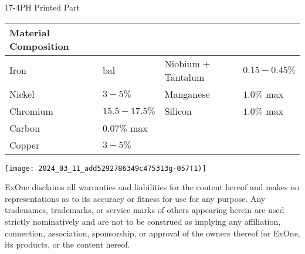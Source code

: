 \documentclass[10pt]{article}
\begin{document}
17-4PH Printed Part

\begin{center}
\begin{tabular}{|l|l|l|l|}
\hline
Material Composition &  &  &  \\
\hline
Iron & bal & Niobium + Tantalum & $0.15-0.45 \%$ \\
\hline
Nickel & $3-5 \%$ & Manganese & $1.0 \%$ max \\
\hline
Chromium & $15.5-17.5 \%$ & Silicon & $1.0 \%$ max \\
\hline
Carbon & $0.07 \%$ max &  &  \\
\hline
Copper & $3-5 \%$ &  &  \\
\hline
\end{tabular}
\end{center}

\begin{center}
\texttt{[image: 2024\_03\_11\_add5292786349c475313g-057(1)]}
\end{center}

ExOne disclaims all warranties and liabilities for the content hereof and makes no representations as to its accuracy or fitness for use for any purpose. Any tradenames, trademarks, or service marks of others appearing herein are used strictly nominatively and are not to be construed as implying any affiliation, connection, association, sponsorship, or approval of the owners thereof for ExOne, its products, or the content hereof.
\end{document}
